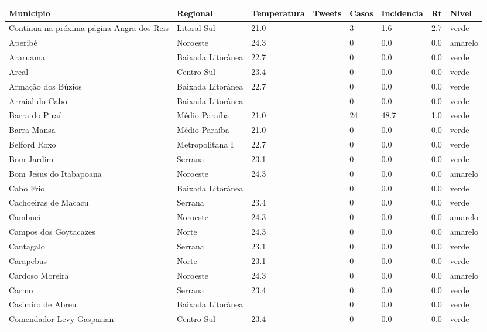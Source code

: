\begin{longtable}{l|lllllll}
  \hline
Municipio & Regional & Temperatura & Tweets & Casos & Incidencia & Rt & Nivel \\ 
  \hline
\endhead
\hline
{\footnotesize Continua na próxima página}
\endfoot
\endlastfoot
Angra dos Reis & Litoral Sul & 21.0 &  & 3 & 1.6 & 2.7 & verde \\ 
  Aperibé & Noroeste & 24.3 &  & 0 & 0.0 & 0.0 & amarelo \\ 
  Araruama & Baixada Litorânea & 22.7 &  & 0 & 0.0 & 0.0 & verde \\ 
  Areal & Centro Sul & 23.4 &  & 0 & 0.0 & 0.0 & verde \\ 
  Armação dos Búzios & Baixada Litorânea & 22.7 &  & 0 & 0.0 & 0.0 & verde \\ 
  Arraial do Cabo & Baixada Litorânea &  &  & 0 & 0.0 & 0.0 & verde \\ 
  Barra do Piraí & Médio Paraíba & 21.0 &  & 24 & 48.7 & 1.0 & verde \\ 
  Barra Mansa & Médio Paraíba & 21.0 &  & 0 & 0.0 & 0.0 & verde \\ 
  Belford Roxo & Metropolitana I & 22.7 &  & 0 & 0.0 & 0.0 & verde \\ 
  Bom Jardim & Serrana & 23.1 &  & 0 & 0.0 & 0.0 & verde \\ 
  Bom Jesus do Itabapoana & Noroeste & 24.3 &  & 0 & 0.0 & 0.0 & amarelo \\ 
  Cabo Frio & Baixada Litorânea &  &  & 0 & 0.0 & 0.0 & verde \\ 
  Cachoeiras de Macacu & Serrana & 23.4 &  & 0 & 0.0 & 0.0 & verde \\ 
  Cambuci & Noroeste & 24.3 &  & 0 & 0.0 & 0.0 & amarelo \\ 
  Campos dos Goytacazes & Norte & 24.3 &  & 0 & 0.0 & 0.0 & amarelo \\ 
  Cantagalo & Serrana & 23.1 &  & 0 & 0.0 & 0.0 & verde \\ 
  Carapebus & Norte & 23.1 &  & 0 & 0.0 & 0.0 & verde \\ 
  Cardoso Moreira & Noroeste & 24.3 &  & 0 & 0.0 & 0.0 & amarelo \\ 
  Carmo & Serrana & 23.4 &  & 0 & 0.0 & 0.0 & verde \\ 
  Casimiro de Abreu & Baixada Litorânea &  &  & 0 & 0.0 & 0.0 & verde \\ 
  Comendador Levy Gasparian & Centro Sul & 23.4 &  & 0 & 0.0 & 0.0 & verde \\ 

\end{longtable}
